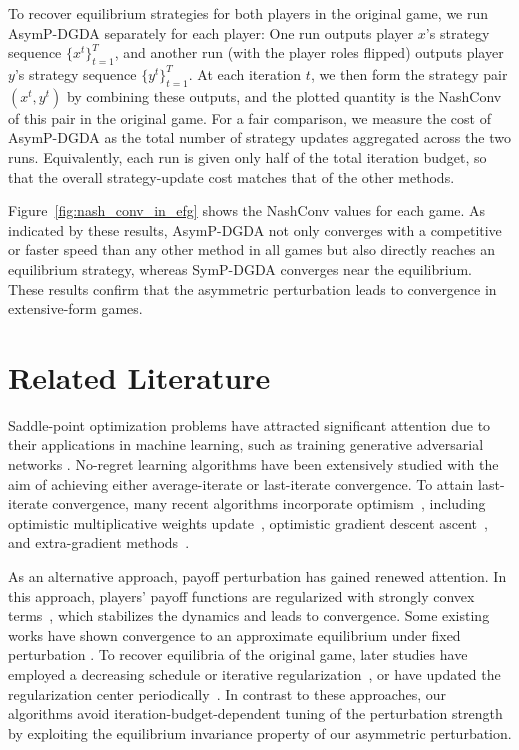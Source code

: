 \documentclass{article}
\theoremstyle{plain}
\begin{document}
To recover equilibrium strategies for both players in the original game, we run AsymP-DGDA separately for each player: One run outputs player $x$'s strategy sequence $\{x^t\}_{t=1}^T$, and another run (with the player roles flipped) outputs player $y$'s strategy sequence $\{y^t\}_{t=1}^T$.
At each iteration $t$, we then form the strategy pair $(x^t, y^t)$ by combining these outputs, and the plotted quantity is the NashConv of this pair in the original game.
For a fair comparison, we measure the cost of AsymP-DGDA as the total number of strategy updates aggregated across the two runs.
Equivalently, each run is given only half of the total iteration budget, so that the overall strategy-update cost matches that of the other methods.

Figure~\ref{fig:nash_conv_in_efg} shows the NashConv values for each game.
As indicated by these results, AsymP-DGDA not only converges with a competitive or faster speed than any other method in all games but also directly reaches an equilibrium strategy, whereas SymP-DGDA converges near the equilibrium.
These results confirm that the asymmetric perturbation leads to convergence in extensive-form games.

\section{Related Literature}
Saddle-point optimization problems have attracted significant attention due to their applications in machine learning, such as training generative adversarial networks \citep{daskalakis2017training}.
No-regret learning algorithms have been extensively studied with the aim of achieving either average-iterate or last-iterate convergence.
To attain last-iterate convergence, many recent algorithms incorporate optimism~\citep{rakhlin2013online,rakhlin2013optimization}, including optimistic multiplicative weights update~\citep{daskalakis2018last,lei:aistats:2021,wei2020linear}, optimistic gradient descent ascent~\citep{daskalakis2017training,mertikopoulos2018optimistic,de2022convergence}, and extra-gradient methods~\citep{golowich2020last,mokhtari2020unified}.

As an alternative approach, payoff perturbation has gained renewed attention.
In this approach, players' payoff functions are regularized with strongly convex terms~\citep{cen2021fast,cen2022faster,pmlr-v206-pattathil23a}, which stabilizes the dynamics and leads to convergence.
Some existing works have shown convergence to an approximate equilibrium under fixed perturbation \citep{sokota2022unified,Tuyls2006,coucheney2015penalty,leslie2005individual,abe2022mutationdriven,hussain2023asymptotic}.
To recover equilibria of the original game, later studies have employed a decreasing schedule or iterative regularization~\citep{facchinei2003finite,koshal2013regularized,yousefian2017smoothing,bernasconi2024learning,liu2022power,cai2023uncoupled}, or have updated the regularization center periodically~\citep{perolat2021poincare,abe2022last, abe2024slingshot}.
In contrast to these approaches, our algorithms avoid iteration-budget-dependent tuning of the perturbation strength by exploiting the equilibrium invariance property of our asymmetric perturbation.
\end{document}
